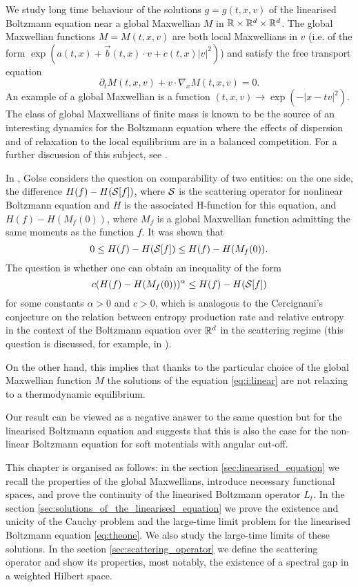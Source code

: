 We study long time behaviour of the solutions $g=g(t,x,v)$ of the linearised Boltzmann equation near a global Maxwellian $M$ in ${\mathbb R}\times{{\mathbb R^d}\times{\mathbb R^d}}$. The global Maxwellian functions $M=M(t,x,v)$ are both local Maxwellians in $v$ (i.e. of the form $\exp (a(t,x)+\vec b(t,x)\cdot v + c(t,x)|v|^2)$) and satisfy the free transport equation \[\partial_t M(t,x,v)+v\cdot\nabla_x M(t,x,v)=0.\]
An example of a global Maxwellian is a function $(t,x,v)\to \exp(-|x-tv|^2)$.
The class of global Maxwellians of finite mass is known to be the source of an interesting dynamics for the Boltzmann equation where the effects of dispersion and of relaxation to the local equilibrium are in a balanced competition. For a further discussion of this subject, see \cite{FG}. 


In \cite{Golse2015Dispersion}, Golse considers the question on comparability of two entities: on the one side, the difference $H(f)-H(\mathcal S [f])$, where $\mathcal S$ is the scattering operator for nonlinear Boltzmann equation and $H$ is the associated H-function for this equation, and $H(f)-H(M_f(0))$, where $M_f$ is a global Maxwellian function admitting the same moments as the function $f$. It was shown that
\[0\le H(f)-H(\mathcal S[f])\le H(f)-H(M_f(0)).\]
The question is whether one can obtain an inequality of the form 
\[c(H(f)-H(M_f(0)))^\alpha\le H(f)-H(\mathcal S[f]) \]
for some constants $\alpha>0$ and $c>0$, which is analogous to the Cercignani's conjecture on the relation between entropy production rate and relative entropy in the context of the Boltzmann equation over ${\mathbb R^d}$ in the scattering regime (this question is discussed, for example, in \cite{Villani2008Entropy}).

On the other hand, this implies that thanks to the particular choice of the global Maxwellian function $M$ the solutions of the equation \eqref{eq:i:linear} are not relaxing to a thermodynamic equilibrium.

Our result can be viewed as a negative answer to the same question but for the linearised Boltzmann equation and suggests that this is also the case for the non-linear Boltzmann equation for soft motentials with angular cut-off.

This chapter is organised as follows: in the section \ref{sec:linearised_equation} we recall the properties of the global Maxwellians, introduce necessary functional spaces, and prove the continuity of the linearised Boltzmann operator $L_t$.	In the section \ref{sec:solutions_of_the_linearised_equation} we prove the existence and unicity of the Cauchy problem and the large-time limit problem for the linearised Boltzmann equation \eqref{eq:theone}. We also study the large-time limits of these solutions. In the section \ref{sec:scattering_operator} we define the scattering operator and show its properties, most notably, the existence of a spectral gap in a weighted Hilbert space.

